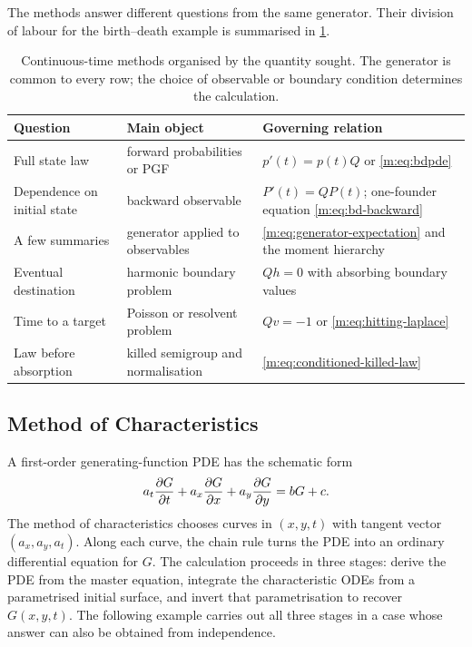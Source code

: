 The methods answer different questions from the same generator.  Their division
of labour for the birth--death example is summarised in
\cref{m:tab:ct-method-summary}.
\begin{table}[H]
  \centering
  \small
  \begin{tabular}{>{\raggedright\arraybackslash}p{}
                  >{\raggedright\arraybackslash}p{}
                  >{\raggedright\arraybackslash}p{}}
    \toprule
    Question & Main object & Governing relation \\
    \midrule
    Full state law & forward probabilities or PGF &
      $p'(t)=p(t)Q$ or \cref{m:eq:bdpde} \\
    Dependence on initial state & backward observable &
      $P'(t)=QP(t)$; one-founder equation \cref{m:eq:bd-backward} \\
    A few summaries & generator applied to observables &
      \cref{m:eq:generator-expectation} and the moment hierarchy \\
    Eventual destination & harmonic boundary problem &
      $Qh=0$ with absorbing boundary values \\
    Time to a target & Poisson or resolvent problem &
      $Qv=-1$ or \cref{m:eq:hitting-laplace} \\
    Law before absorption & killed semigroup and normalisation &
      \cref{m:eq:conditioned-killed-law} \\
    \bottomrule
  \end{tabular}
  \caption{Continuous-time methods organised by the quantity sought.  The
  generator is common to every row; the choice of observable or boundary
  condition determines the calculation.}
  \label{m:tab:ct-method-summary}
\end{table}

\subsection{Method of Characteristics}\label{m:sec:moc}

A first-order generating-function PDE has the schematic form
\[
  a_t\frac{\partial G}{\partial t}+a_x\frac{\partial G}{\partial x}+a_y\frac{\partial G}{\partial y}=bG+c.
\]
The method of characteristics chooses curves in $(x,y,t)$ with tangent vector
$(a_x,a_y,a_t)$.  Along each curve, the chain rule turns the PDE into an ordinary
differential equation for $G$.  The calculation proceeds in three stages: derive
the PDE from the master equation, integrate the characteristic ODEs from a
parametrised initial surface, and invert that parametrisation to recover
$G(x,y,t)$.  The following example carries out all three stages in a case whose
answer can also be obtained from independence.

